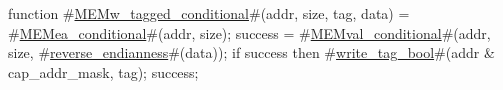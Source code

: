 function #\hyperref[zMEMwzytaggedzyconditional]{MEMw\_tagged\_conditional}#(addr, size, tag, data) =
{
  #\hyperref[zMEMeazyconditional]{MEMea\_conditional}#(addr, size);
  success = #\hyperref[zMEMvalzyconditional]{MEMval\_conditional}#(addr, size, #\hyperref[zreversezyendianness]{reverse\_endianness}#(data));
  if success then
     #\hyperref[zwritezytagzybool]{write\_tag\_bool}#(addr & cap_addr_mask, tag);
  success;
}
